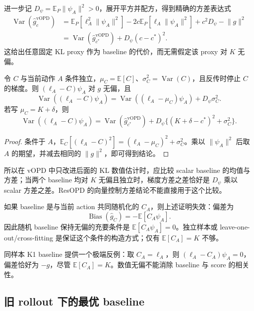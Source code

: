 \documentclass[lang=cn,scheme=chinese,openany]{../book/elegantbook}
\newcommand{\E}{\mathbb E}
\newcommand{\Var}{\operatorname{Var}}
\begin{document}
进一步记 $D_\psi=\E_P\lVert \psi_A\rVert^2>0$，展开平方并配方，得到精确的方差表达式
\begin{align*}
 \Var(\widehat g_c^{\mathrm{vOPD}})
 &=\E_P[\ell_A^2\lVert \psi_A\rVert^2]
   -2c\E_P[\ell_A\lVert \psi_A\rVert^2]+c^2D_\psi-\lVert g\rVert^2\\
 &=\Var(\widehat g_{c^*}^{\mathrm{vOPD}})+D_\psi(c-c^*)^2.
\end{align*}
这给出任意固定 KL proxy 作为 baseline 的代价，而无需假定该 proxy 对 $K$ 无偏。

\begin{proposition}
令 $C$ 与当前动作 $A$ 条件独立，$\mu_C=\E[C]$、$\sigma_C^2=\Var(C)$，且反传时停止 $C$ 的梯度。则 $(\ell_A-C)\psi_A$ 对 $g$ 无偏，且
\begin{equation*}
 \Var((\ell_A-C)\psi_A)
 =\Var((\ell_A-\mu_C)\psi_A)+D_\psi\sigma_C^2.
\end{equation*}
若写 $\mu_C=K+\delta$，则
\begin{equation*}
 \Var((\ell_A-C)\psi_A)
 =\Var(\widehat g_{c^*}^{\mathrm{vOPD}})
  +D_\psi\{(K+\delta-c^*)^2+\sigma_C^2\}.
\end{equation*}
\end{proposition}

\begin{proof}
条件于 $A$，$\E_C[(\ell_A-C)^2]=(\ell_A-\mu_C)^2+\sigma_C^2$。乘以 $\lVert \psi_A\rVert^2$ 后取 $A$ 的期望，并减去相同的 $\lVert g\rVert^2$，即可得到结论。
\end{proof}

所以在 vOPD 中只改进后面的 KL 数值估计时，应比较 scalar baseline 的均值与方差；当两个 baseline 均对 $K$ 无偏且独立时，梯度方差之差恰好是 $D_\psi$ 乘以 scalar 方差之差。ResOPD 的向量控制方差结论不能直接用于这个比较。

如果 baseline 是与当前 action 共同随机化的 $C_A$，则上述证明失效：偏差为
\begin{equation}
 \operatorname{Bias}(\widehat g_C)=-\E[C_A\psi_A].
 \label{est:eq:chapter3-random-baseline-bias}
\end{equation}
因此随机 baseline 保持无偏的充要条件是 $\E[C_A\psi_A]=0$。独立样本或 leave-one-out/cross-fitting 是保证这个条件的构造方式；仅有 $\E[C_A]=K$ 不够。

同样本 K1 baseline 提供一个极端反例：取 $C_A=\ell_A$，则 $(\ell_A-C_A)\psi_A=0$，偏差恰好为 $-g$，尽管 $\E[C_A]=K$。数值无偏不能消除 baseline 与 score 的相关性。

\subsection{旧 rollout 下的最优 baseline}
\end{document}
